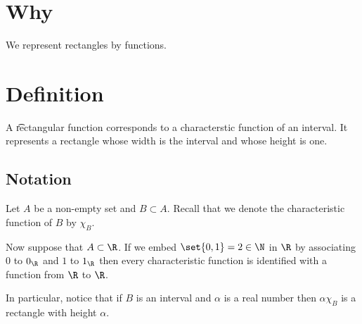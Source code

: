 
\section*{Why}

We represent rectangles by functions.

\section*{Definition}

A \t{rectangular function} corresponds to a characterstic function of an interval.
It represents a rectangle whose width is the interval and whose height is one.
%  


\subsection*{Notation}

Let $A$ be a non-empty set and $B \subset A$.
Recall that we denote the characteristic function of $B$ by $\chi _{B}$.

Now suppose that $A \subset \R $.
If we embed $\set{0, 1} = 2 \in \N  $ in $\R $ by associating $0$ to $0_{\R }$ and $1$ to $1_{\R }$ then every characteristic function is identified with a function from $\R $ to $\R $.

In particular, notice that if $B$ is an interval and $\alpha $ is a real number then $\alpha  \chi _{B}$ is a rectangle with height $\alpha $.

\blankpage